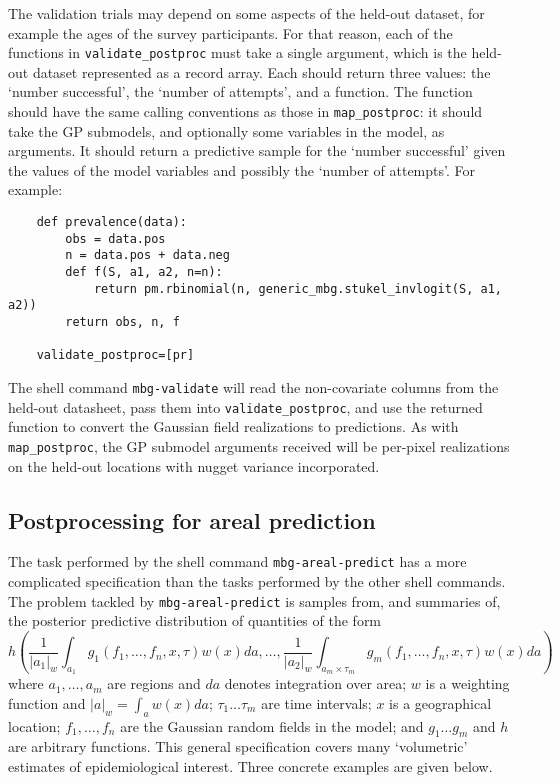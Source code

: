 The validation trials may depend on some aspects of the held-out dataset, for example the ages of the survey participants. For that reason, each of the functions in \texttt{validate\_postproc} must take a single argument, which is the held-out dataset represented as a record array. Each should return three values: the `number successful', the `number of attempts', and a function. The function should have the same calling conventions as those in \texttt{map\_postproc}: it should take the GP submodels, and optionally some variables in the model, as arguments. It should return a predictive sample for the `number successful' given the values of the model variables and possibly the `number of attempts'. For example:
\begin{verbatim}
    def prevalence(data):
        obs = data.pos
        n = data.pos + data.neg
        def f(S, a1, a2, n=n):
            return pm.rbinomial(n, generic_mbg.stukel_invlogit(S, a1, a2))
        return obs, n, f

    validate_postproc=[pr]    
\end{verbatim}

The shell command \texttt{mbg-validate} will read the non-covariate columns from the held-out datasheet, pass them into \texttt{validate\_postproc}, and use the returned function to convert the Gaussian field realizations to predictions. As with \texttt{map\_postproc}, the GP submodel arguments received will be per-pixel realizations on the held-out locations with nugget variance incorporated.

\subsection{Postprocessing for areal prediction}  

The task performed by the shell command \texttt{mbg-areal-predict} has a more complicated specification than the tasks performed by the other shell commands. The problem tackled by \texttt{mbg-areal-predict} is samples from, and summaries of, the posterior predictive distribution of quantities of the form
\begin{equation}
    \label{eq:areal-targ} 
    h\left(\frac{1}{|a_1|_w}\int_{a_1} g_1(f_1,\ldots,f_n,x,\tau)w(x)da, \ldots,\frac{1}{|a_2|_w}\int_{a_m\times\tau_m} g_m(f_1,\ldots,f_n,x,\tau)w(x)da\right)
\end{equation}
where $a_1,\ldots,a_m$ are regions and $da$ denotes integration over area; $w$ is a weighting function and $|a|_w=\int_a w(x)da$; $\tau_1\ldots\tau_m$ are time intervals; $x$ is a geographical location; $f_1,\ldots,f_n$ are the Gaussian random fields in the model; and $g_1\ldots g_m$ and $h$ are arbitrary functions. This general specification covers many `volumetric' estimates of epidemiological interest. Three concrete examples are given below.

